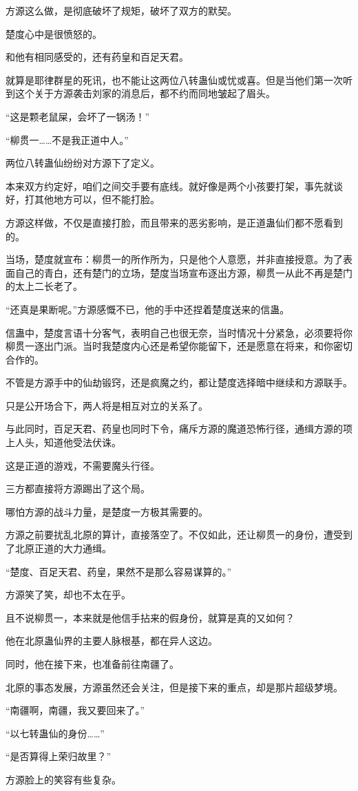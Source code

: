 \begin{this_body}
方源这么做，是彻底破坏了规矩，破坏了双方的默契。

楚度心中是很愤怒的。

和他有相同感受的，还有药皇和百足天君。

就算是耶律群星的死讯，也不能让这两位八转蛊仙或忧或喜。但是当他们第一次听到这个关于方源袭击刘家的消息后，都不约而同地皱起了眉头。

“这是颗老鼠屎，会坏了一锅汤！”

“柳贯一……不是我正道中人。”

两位八转蛊仙纷纷对方源下了定义。

本来双方约定好，咱们之间交手要有底线。就好像是两个小孩要打架，事先就谈好，打其他地方可以，但不能打脸。

方源这样做，不仅是直接打脸，而且带来的恶劣影响，是正道蛊仙们都不愿看到的。

当场，楚度就宣布：柳贯一的所作所为，只是他个人意愿，并非直接授意。为了表面自己的青白，还有楚门的立场，楚度当场宣布逐出方源，柳贯一从此不再是楚门的太上二长老了。

“还真是果断呢。”方源感慨不已，他的手中还捏着楚度送来的信蛊。

信蛊中，楚度言语十分客气，表明自己也很无奈，当时情况十分紧急，必须要将你柳贯一逐出门派。当时我楚度内心还是希望你能留下，还是愿意在将来，和你密切合作的。

不管是方源手中的仙劫锻窍，还是疯魔之约，都让楚度选择暗中继续和方源联手。

只是公开场合下，两人将是相互对立的关系了。

与此同时，百足天君、药皇也同时下令，痛斥方源的魔道恐怖行径，通缉方源的项上人头，知道他受法伏诛。

这是正道的游戏，不需要魔头行径。

三方都直接将方源踢出了这个局。

哪怕方源的战斗力量，是楚度一方极其需要的。

方源之前要扰乱北原的算计，直接落空了。不仅如此，还让柳贯一的身份，遭受到了北原正道的大力通缉。

“楚度、百足天君、药皇，果然不是那么容易谋算的。”

方源笑了笑，却也不太在乎。

且不说柳贯一，本来就是他信手拈来的假身份，就算是真的又如何？

他在北原蛊仙界的主要人脉根基，都在异人这边。

同时，他在接下来，也准备前往南疆了。

北原的事态发展，方源虽然还会关注，但是接下来的重点，却是那片超级梦境。

“南疆啊，南疆，我又要回来了。”

“以七转蛊仙的身份……”

“是否算得上荣归故里？”

方源脸上的笑容有些复杂。

\end{this_body}

